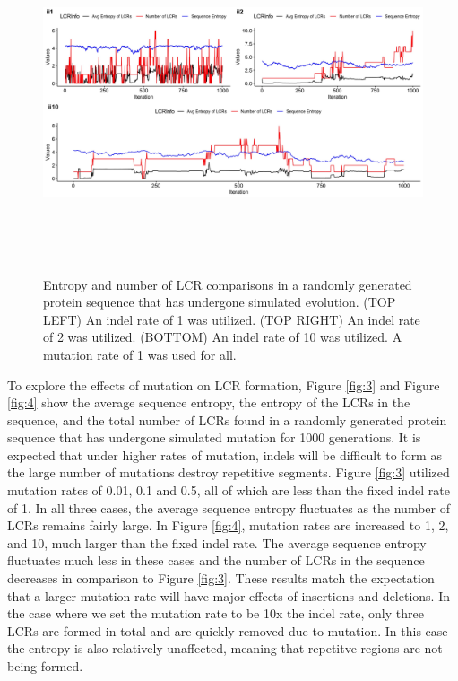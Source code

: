 \documentclass[10pt]{article}
\providecommand{\figref}[1]{Figure \ref{#1}}  %
\begin{document}
\begin{figure}[H]
	\includegraphics[width=18cm, height=10cm]{im1-2-10.jpeg}
	\caption{Entropy and number of LCR comparisons in a randomly generated protein sequence that has undergone simulated evolution. (TOP LEFT) An indel rate of 1 was utilized. (TOP RIGHT) An indel rate of 2 was utilized. (BOTTOM) An indel rate of 10 was utilized. A mutation rate of 1 was used for all.}
	\label{fig:2}
\end{figure}

To explore the effects of mutation on LCR formation, \figref{fig:3} and \figref{fig:4} show the average sequence entropy, the entropy of the LCRs in the sequence, and the total number of LCRs found in a randomly generated protein sequence that has undergone simulated mutation for 1000 generations. It is expected that under higher rates of mutation, indels will be difficult to form as the large number of mutations destroy repetitive segments. \figref{fig:3} utilized mutation rates of 0.01, 0.1 and 0.5, all of which are less than the fixed indel rate of 1. In all three cases, the average sequence entropy fluctuates as the number of LCRs remains fairly large. In \figref{fig:4}, mutation rates are increased to 1, 2, and 10, much larger than the fixed indel rate. The average sequence entropy fluctuates much less in these cases and the number of LCRs in the sequence decreases in comparison to \figref{fig:3}. These results match the expectation that a larger mutation rate will have major effects of insertions and deletions. In the case where we set the mutation rate to be 10x the indel rate, only three LCRs are formed in total and are quickly removed due to mutation. In this case the entropy is also relatively unaffected, meaning that repetitve regions are not being formed.
\end{document}
